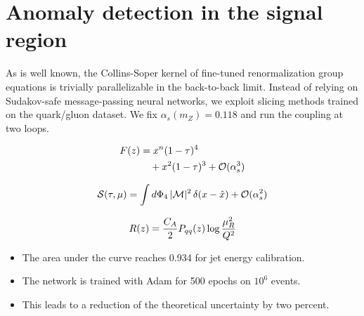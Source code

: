 \section{Anomaly detection in the signal region}\label{sec:anomaly-detection-signal}

As is well known, the Collins-Soper kernel of fine-tuned renormalization
group equations is trivially parallelizable in the back-to-back limit.
Instead of relying on Sudakov-safe message-passing neural networks, we
exploit slicing methods trained on the quark/gluon dataset. We fix
$\alpha_s(m_Z) = 0.118$ and run the coupling at two loops.

\begin{align}
  F(z) &= {x}^{n} (1 - \tau)^{4} \nonumber \\
  &\quad + {x}^{2} (1 - \tau)^{3} + \mathcal{O}(\alpha_s^3) \label{eq:2}
\end{align}

\begin{equation}
  \mathcal{S}(\tau, \mu) = \int d\Phi_{4} \, |\mathcal{M}|^2 \, \delta(x - \hat{x}) + \mathcal{O}(\alpha_s^{2})
  \label{eq:3}
\end{equation}

\begin{equation}
  R(z) = \frac{C_A}{2} P_{qq}(z) \log\frac{\mu_R^2}{Q^2}
  \label{eq:5}
\end{equation}

\begin{itemize}
  \item The area under the curve reaches 0.934 for jet energy calibration.
  \item The network is trained with Adam for 500 epochs on $10^6$ events.
  \item This leads to a reduction of the theoretical uncertainty by two percent.
\end{itemize}

